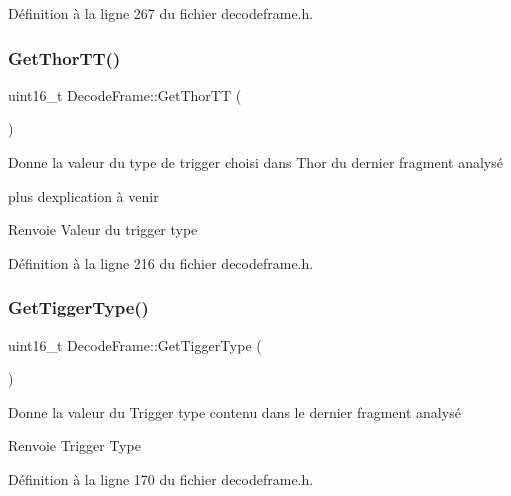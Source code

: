 Définition à la ligne 267 du fichier decodeframe.\+h.

\mbox{\label{class_decode_frame_a5fafd547d67ae2f38635174a402b5824}} 
\subsubsection{\texorpdfstring{Get\+Thor\+T\+T()}{GetThorTT()}}
{\footnotesize\ttfamily uint16\+\_\+t Decode\+Frame\+::\+Get\+Thor\+TT (\begin{DoxyParamCaption}{ }\end{DoxyParamCaption})\hspace{0.3cm}{\ttfamily [inline]}}



Donne la valeur du type de trigger choisi dans Thor du dernier fragment analysé 

plus d\textquotesingle{}explication à venir \begin{DoxyReturn}{Renvoie}
Valeur du trigger type 
\end{DoxyReturn}


Définition à la ligne 216 du fichier decodeframe.\+h.

\mbox{\label{class_decode_frame_a4bd099178e4f7a067dac451d2cb844b2}} 
\subsubsection{\texorpdfstring{Get\+Tigger\+Type()}{GetTiggerType()}}
{\footnotesize\ttfamily uint16\+\_\+t Decode\+Frame\+::\+Get\+Tigger\+Type (\begin{DoxyParamCaption}{ }\end{DoxyParamCaption})\hspace{0.3cm}{\ttfamily [inline]}}



Donne la valeur du Trigger type contenu dans le dernier fragment analysé 

\begin{DoxyReturn}{Renvoie}
Trigger Type 
\end{DoxyReturn}


Définition à la ligne 170 du fichier decodeframe.\+h.

